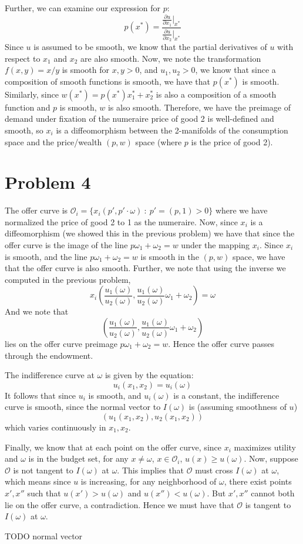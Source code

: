 \documentclass[10pt,letter]{article}
\begin{document}
Further, we can examine our expression for $p$:
\[ p(x^*) = \frac{\frac{\partial u}{\partial x_1} \Bigr|_{x^*}}{\frac{\partial u}{\partial x_2} \Bigr|_{x^*}} \]
Since $u$ is assumed to be smooth, we know that the partial derivatives of $u$ with respect to $x_1$ and $x_2$ are also smooth. Now, we note the transformation $f(x,y) = x/y$ is smooth for $x,y > 0$, and $u_1, u_2 > 0$, we know that since a composition of smooth functions is smooth, we have that $p(x^*)$ is smooth. Similarly, since $w(x^*) = p(x^*) x^*_1 + x^*_2$ is also a composition of a smooth function and $p$ is smooth, $w$ is also smooth. Therefore, we have the preimage of demand under fixation of the numeraire price of good 2 is well-defined and smooth, so $x_i$ is a diffeomorphism between the 2-manifolds of the consumption space and the price/wealth $(p,w)$ space (where $p$ is the price of good 2).

\section*{Problem 4}

The offer curve is $\mathcal{O}_i = \{ x_i(p', p' \cdot \omega) \ : \ p' = (p, 1) > 0 \} $ where we have normalized the price of good 2 to 1 as the numeraire.
Now, since $x_i$ is a diffeomorphism (we showed this in the previous problem) we have that since the offer curve is the image of the line $p \omega_1 + \omega_2 = w$ under the mapping $x_i$. Since $x_i$ is smooth, and the line $p \omega_1 + \omega_2 = w$ is smooth in the $(p,w)$ space, we have that the offer curve is also smooth. Further, we note that using the inverse we computed in the previous problem,
\[ x_i \left( \frac{u_1(\omega)}{u_2(\omega)}, \frac{u_1(\omega)}{u_2(\omega)}\omega_1  + \omega_2 \right) = \omega \]
And we note that
\[ \left( \frac{u_1(\omega)}{u_2(\omega)}, \frac{u_1(\omega)}{u_2(\omega)}\omega_1  + \omega_2 \right) \]
lies on the offer curve preimage $p \omega_1 + \omega_2 = w$. Hence the offer curve passes through the endowment.

The indifference curve at $\omega$ is given by the equation:
\[ u_i(x_1, x_2) = u_i(\omega) \]
It follows that since $u_i$ is smooth, and $u_i(\omega)$ is a constant, the indifference curve is smooth, since the normal vector to $I(\omega)$ is (assuming smoothness of $u$)
\[ (u_1(x_1, x_2), u_2(x_1, x_2)) \]
which varies continuously in $x_1, x_2$.

Finally, we know that at each point on the offer curve, since $x_i$ maximizes utility and $\omega$ is in the budget set, for any $x \neq \omega$, $x \in \mathcal{O}_i$, $u(x) \ge u(\omega)$. Now, suppose $\mathcal{O}$ is not tangent to $I(\omega)$ at $\omega$. This implies that $\mathcal{O}$ must cross $I(\omega)$ at $\omega$, which means since $u$ is increasing, for any neighborhood of $\omega$, there exist points $x', x''$ such that $u(x') > u(\omega)$ and $u(x'') < u(\omega)$. But $x', x''$ cannot both lie on the offer curve, a contradiction. Hence we must have that $\mathcal{O}$ is tangent to $I(\omega)$ at $\omega$.

TODO normal vector
\end{document}
